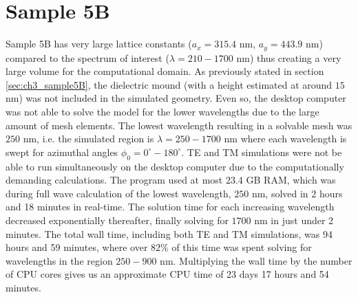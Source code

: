 \clearpage
\section{Sample 5B}
Sample 5B has very large lattice constants ($a_x=315.4$ nm, $a_y=443.9$ nm) compared to the spectrum of interest ($\lambda=210-1700$ nm) thus creating a very large volume for the computational domain. As previously stated in section \ref{sec:ch3_sample5B}, the dielectric mound (with a height estimated at around $15$ nm) was not included in the simulated geometry. Even so, the desktop computer was not able to solve the model for the lower wavelengths due to the large amount of mesh elements. The lowest wavelength resulting in a solvable mesh was $250$ nm, i.e. the simulated region is $\lambda=250-1700$ nm where each wavelength is swept for azimuthal angles $\phi_0=0^\circ-180^\circ$. TE and TM simulations were not be able to run simultaneously on the desktop computer due to the computationally demanding calculations. The program used at most $23.4$ GB RAM, which was during full wave calculation of the lowest wavelength, $250$ nm, solved in 2 hours and 18 minutes in real-time. The solution time for each increasing wavelength decreased exponentially thereafter, finally solving for $1700$ nm in just under 2 minutes. The total wall time, including both TE and TM simulations, was 94 hours and 59 minutes, where over $82\%$ of this time was spent solving for wavelengths in the region $250-900$ nm. Multiplying the wall time by the number of CPU cores gives us an approximate CPU time of 23 days 17 hours and 54 minutes. 

